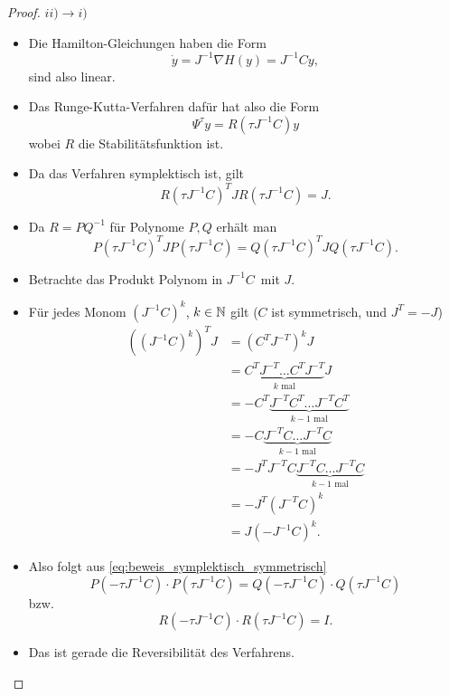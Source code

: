 \begin{proof}
	$ii) \to i)$\\
	\begin{itemize}
		\item Die Hamilton-Gleichungen haben die Form
		\begin{equation*}
		\dot y = J^{-1} \nabla H(y) = J^{-1}Cy,
		\end{equation*}
		sind also linear.
		\item Das Runge-Kutta-Verfahren dafür hat also die Form
		\begin{equation*}
		\Psi^\tau y = R(\tau J^{-1} C) y
		\end{equation*}
		wobei $R$ die Stabilitätsfunktion ist.
		\item Da das Verfahren symplektisch ist, gilt
		\begin{equation*}
		R(\tau J^{-1} C)^T J R(\tau J^{-1} C) = J.
		\end{equation*}
		
		\item Da $R= PQ^{-1}$ für Polynome $P,Q$ erhält man
		\begin{equation}\label{eq:beweis_symplektisch_symmetrisch}
		P(\tau J^{-1} C)^T JP(\tau J^{-1} C) = Q(\tau J^{-1} C)^T J Q(\tau J^{-1} C).
		\end{equation}
		
		\item Betrachte das Produkt \glqq Polynom in $J^{-1} C$\grqq\ mit $J$.
		
		\item Für jedes Monom $(J^{-1} C)^k$, $k \in \mathbb N$ gilt
		($C$ ist symmetrisch, und $J^T = -J$)
		\begin{align*}
		((J^{-1} C)^k)^T J
		& =
		(C^T J^{-T})^k J \\
		& =
		\underbrace{C^TJ^{-T} \dots C^TJ^{-T}}_{\text{$k$ mal}} J \\
		& =
		-C^T\underbrace{J^{-T}C^T \dots J^{-T}C^T}_{\text{$k-1$ mal}} \\
		& =
		-C\underbrace{J^{-T}C \dots J^{-T}C}_{\text{$k-1$ mal}} \\
		& =
		-J^T J^{-T} C\underbrace{J^{-T}C \dots J^{-T}C}_{\text{$k-1$ mal}} \\
		& =
		-J^T (J^{-T}C)^k \\
		& =
		J(-J^{-1} C)^k.
		\end{align*}
		\item Also folgt aus \eqref{eq:beweis_symplektisch_symmetrisch}
		\begin{equation*}
		P(-\tau J^{-1} C)\cdot P(\tau J^{-1} C) =  Q(-\tau J^{-1} C)\cdot Q(\tau J^{-1} C)
		\end{equation*}
		bzw.
		\begin{equation*}
		R(-\tau J^{-1} C)\cdot R(\tau J^{-1} C) = I.
		\end{equation*}
		\item  Das ist gerade die Reversibilität des Verfahrens.
	\end{itemize}
\end{proof}

